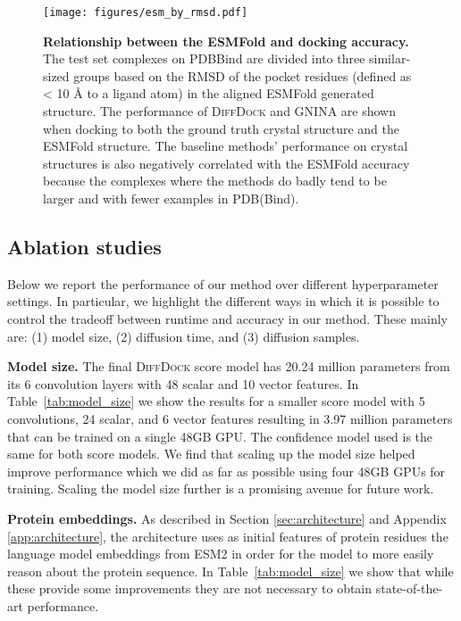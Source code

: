 \documentclass{article} \usepackage{iclr2023_conference,times}
\newcommand{\new}[1]{#1}
\begin{document}
\clearpage


\begin{figure}[htb]
\begin{center}
\texttt{[image: figures/esm\_by\_rmsd.pdf]}
\caption{\textbf{Relationship between the ESMFold and docking accuracy.} The test set complexes on PDBBind are divided into three similar-sized groups based on the RMSD of the pocket residues (defined as < 10 \AA{} to a ligand atom) in the aligned ESMFold generated structure. The performance of \textsc{DiffDock} and GNINA are shown when docking to both the ground truth crystal structure and the ESMFold structure. The baseline methods' performance on crystal structures is also negatively correlated with the ESMFold accuracy because the complexes where the methods do badly tend to be larger and with fewer examples in PDB(Bind).  }
\label{fig:esm_by_rmsd}
\end{center}
 \vskip -0.1cm
\end{figure}


\subsection{Ablation studies} \label{app:ablations}

Below we report the performance of our method over different hyperparameter settings. In particular, we highlight the different ways in which it is possible to control the tradeoff between runtime and accuracy in our method. These mainly are: (1) model size, (2) diffusion time, and (3) diffusion samples.

\textbf{Model size.}  The final \textsc{DiffDock} score model has 20.24 million parameters from its 6 convolution layers with 48 scalar and 10 vector features. In Table~\ref{tab:model_size} we show the results for a smaller score model with 5 convolutions, 24 scalar, and 6 vector features resulting in 3.97 million parameters that can be trained on a single 48GB GPU. The confidence model used is the same for both score models. We find that scaling up the model size helped improve performance which we did as far as possible using four 48GB GPUs for training. Scaling the model size further is a promising avenue for future work.

\new{\textbf{Protein embeddings.}  As described in Section \ref{sec:architecture} and Appendix \ref{app:architecture}, the architecture uses as initial features of protein residues the language model embeddings from ESM2 \citep{Lin2022ESM2} in order for the model to more easily reason about the protein sequence. In Table~\ref{tab:model_size} we show that while these provide some improvements they are not necessary to obtain state-of-the-art performance.}
\end{document}

